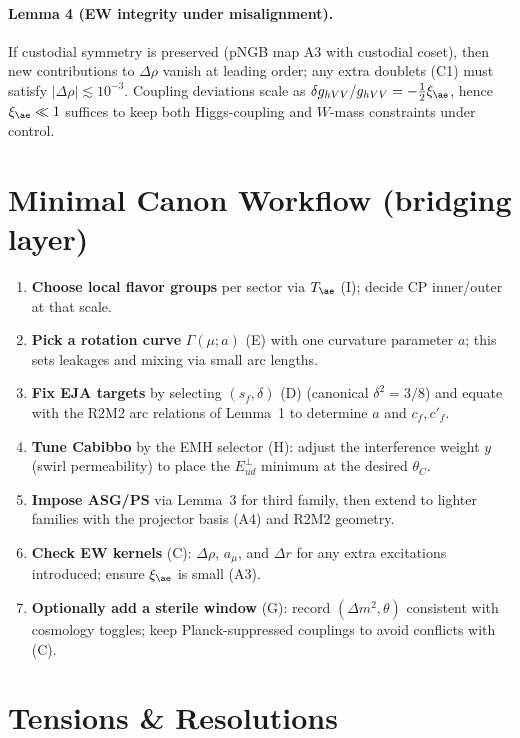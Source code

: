 \paragraph{Lemma 4 (EW integrity under misalignment).} If custodial symmetry is preserved (pNGB map A3 with custodial coset), then new contributions to $\Delta\rho$ vanish at leading order; any extra doublets (C1) must satisfy $|\Delta\rho|\lesssim10^{-3}$. Coupling deviations scale as $\delta g_{hVV}/g_{hVV} = -\tfrac{1}{2}\xi_{\ae}$, hence $\xi_{\ae}\ll1$ suffices to keep both Higgs-coupling and $W$-mass constraints under control.

\section*{ Minimal Canon Workflow (bridging layer)}

\begin{enumerate}
\item \textbf{Choose local flavor groups} per sector via $T_{\ae}$ (I); decide CP inner/outer at that scale.
\item \textbf{Pick a rotation curve} $\Gamma(\mu;a)$ (E) with one curvature parameter $a$; this sets leakages and mixing via small arc lengths.
\item \textbf{Fix EJA targets} by selecting $(s_f,\delta)$ (D) (canonical $\delta^2=3/8$) and equate with the R2M2 arc relations of Lemma~1 to determine $a$ and $c_f,c'_f$.
\item \textbf{Tune Cabibbo} by the EMH selector (H): adjust the interference weight $y$ (swirl permeability) to place the $E^{\perp}_{ud}$ minimum at the desired $\theta_C$.
\item \textbf{Impose ASG/PS} via Lemma~3 for third family, then extend to lighter families with the projector basis (A4) and R2M2 geometry.
\item \textbf{Check EW kernels} (C): $\Delta\rho$, $a_\mu$, and $\Delta r$ for any extra excitations introduced; ensure $\xi_{\ae}$ is small (A3).
\item \textbf{Optionally add a sterile window} (G): record $(\Delta m^2,\theta)$ consistent with cosmology toggles; keep Planck-suppressed couplings to avoid conflicts with (C).
\end{enumerate}

\section*{Tensions \& Resolutions}


